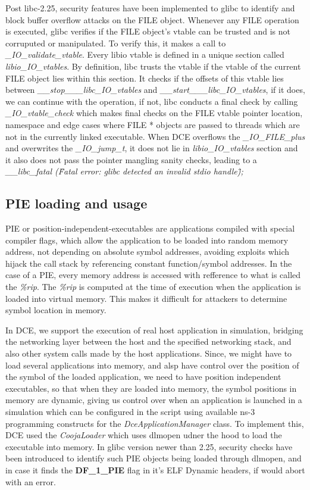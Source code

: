 \documentclass{sig-alternate}
\begin{document}
Post libc-2.25, security features have been implemented to glibc to identify 
and block buffer overflow attacks on the FILE object. Whenever any FILE
operation is executed, glibc 
verifies if the FILE object's vtable can be trusted and is not corruputed or manipulated. To verify this, it makes a call to 
\textit{\_IO\_validate\_vtable}. Every libio vtable is defined in a unique section called \textit{libio\_IO\_vtables}. By definition, libc trusts
the vtable if the vtable of the current FILE object lies within this section. It checks if the offsets of this vtable lies between 
\textit{\_\_stop\_\_\_libc\_IO\_vtables} and \textit{\_\_start\_\_\_libc\_IO\_vtables}, if it does, we can continue with the operation, if not, libc 
conducts a final check by calling \textit{\_IO\_vtable\_check} which makes final checks on the FILE vtable pointer location, namespace and edge cases
where FILE * objects are passed to threads which are not in the currently linked executable.  When DCE overflows the \textit{\_IO\_FILE\_plus} and 
overwrites the \textit{\_IO\_jump\_t}, it does not lie in \textit{libio\_IO\_vtables} section and it also does not pass the pointer mangling sanity checks, leading to a \textit{\_\_libc\_fatal (\"Fatal error: glibc detected an invalid stdio handle\");}

\subsection{PIE loading and usage}
PIE or position-independent-executables are applications compiled with special compiler flags, which allow the application to be loaded into random 
memory address, not depending on absolute symbol addresses, avoiding exploits which hijack the call stack by referencing constant function/symbol addresses.
In the case of a PIE, every memory address is accessed with refference to what is called the \textit{\%rip}. The \textit{\%rip} is computed at the time 
of execution when the application is loaded into virtual memory. This makes it difficult for attackers to determine symbol location in memory.

In DCE, we support the execution of real host application in simulation, bridging the networking layer between the host and the specified networking stack,
and also other system calls made by the host applications. Since, we might have to load several applications into memory, and alsp have control over the
position of the  symbol of the loaded application, we need to have position independent executables, so that when they are loaded into memory,
the symbol positions in memory are dynamic, giving us control over when an application is launched in a simulation which can be configured in the script 
using available ns-3 programming constructs for the \textit{DceApplicationManager} class. To implement this, DCE used the \textit{CoojaLoader} which 
uses dlmopen udner the hood to load the executable into memory. In glibc version newer than 2.25, security checks have been introduced to identify such 
PIE objects being loaded through dlmopen, and in case it finds the \textbf{DF\_1\_PIE} flag in it's ELF Dynamic headers, if would abort with an error.
\end{document}
